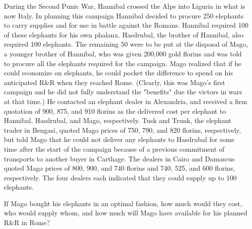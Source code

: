 \documentclass[answers]{exam}
\begin{document}
\begin{questions}
\begin{solution}
\end{solution}

\clearpage

\question
During the Second Punic War, Hannibal crossed the Alps into Liguria in what is now Italy. In planning this campaign Hannibal decided to procure 250 elephants to carry supplies and for use in battle against the Romans. Hannibal required 100 of these elephants for his own phalanx. Hasdrubal, the brother of Hannibal, also required 100 elephants. The remaining 50 were to be put at the disposal of Mago, a younger brother of Hannibal, who was given 200,000 gold florins and was told to procure all the elephants required for the campaign. Mago realized that if he could economize on elephants, he could pocket the difference to spend on his anticipated R\&R when they reached Rome. (Clearly, this was Mago's first campaign and he did not fully understand the "benefits" due the victors in wars at that time.) He contacted an elephant dealer in Alexandria, and received a firm quotation of 900, 875, and 910 florins as the delivered cost per elephant to Hannibal, Hasdrubal, and Mago, respectively. Tusk and Trunk, the elephant trader in Bengasi, quoted Mago prices of 750, 790, and 820 florins, respectively, but told Mago that he could not deliver any elephants to Hasdrubal for some time after the start of the campaign because of a previous commitment of transports to another buyer in Carthage. The dealers in Cairo and Damascus quoted Mago prices of 800, 900, and 740 florins and 740, 525, and 600 florins, respectively. The four dealers each indicated that they could supply up to 100 elephants.

If Mago bought his elephants in an optimal fashion, how much would they cost, who would supply whom, and how much will Mago have available for his planned R\&R in Rome?

\begin{solution}
	\noindent \\
	\begin{centering}
	

\end{centering}
\end{solution}
\end{questions}
\end{document}

